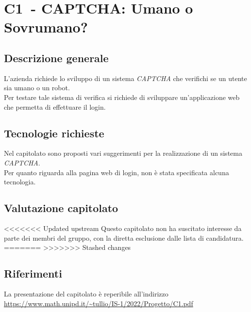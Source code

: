 
\renewcommand{\capName}{CAPTCHA: Umano o Sovrumano?} %
\renewcommand{\capCode}{C1} %
\renewcommand{\capLink}{https://www.math.unipd.it/~tullio/IS-1/2022/Progetto/C1.pdf} %
\renewcommand{\capProposer}{Zucchetti} %


\section{\capCode\ - \capName}
\subsection{Descrizione generale}
L'azienda richiede lo sviluppo di un sistema \emph{CAPTCHA} che verifichi se un utente sia umano o un robot. \\
Per testare tale sistema di verifica si richiede di sviluppare un'applicazione web che permetta di effettuare il login. 

\subsection{Tecnologie richieste}
Nel capitolato sono proposti vari suggerimenti per la realizzazione di un sistema \emph{CAPTCHA}. \\
Per quanto riguarda alla pagina web di login, non è stata specificata alcuna tecnologia.

\subsection{Valutazione capitolato}
<<<<<<< Updated upstream
Questo capitolato non ha suscitato interesse da parte dei membri del gruppo, con la diretta esclusione dalle lista di candidatura.
=======
>>>>>>> Stashed changes

\subsection{Riferimenti}
La presentazione del capitolato è reperibile all'indirizzo \url{\capLink}